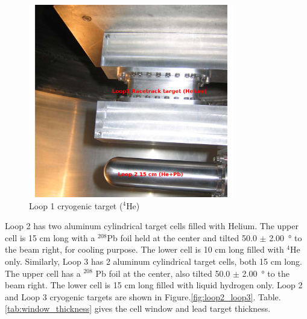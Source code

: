 \begin{figure}[tb!]
\centering
\includegraphics[width=0.8\textwidth]{figs/Loop1_target_edit.png}
\caption[Loop 1 cryogenic target ]{Loop 1 cryogenic target ($^4$He) }\label{fig:loop1}
\end{figure}

Loop 2 has two aluminum cylindrical target cells filled with Helium.
The upper cell is 15 cm long with a $^{208}$Pb foil held at the center
and tilted 50.0 $\pm$ \SI{2.00}{\degree} to the beam right, for cooling purpose.  The lower cell is 10 cm long filled
with $^{4}$He only.
Similarly, Loop 3 has 2 aluminum cylindrical target cells, both 15 cm long. The upper cell has a $^{208}$ Pb foil at
the center, also tilted 50.0 $\pm$ \SI{2.00}{\degree} to the beam right.
The lower cell is 15 cm long filled with liquid hydrogen only.
Loop 2 and Loop 3 cryogenic targets are shown in Figure.\ref{fig:loop2_loop3}.
Table.\ref{tab:window_thickness} gives the cell window and lead target thickness.

